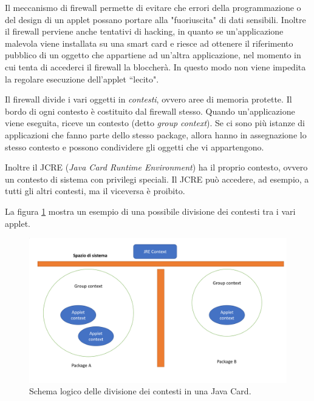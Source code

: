 Il meccanismo di firewall permette di evitare che errori della programmazione o del design di un applet possano portare alla "fuoriuscita" di dati sensibili. Inoltre il firewall perviene anche tentativi di hacking, in quanto se un'applicazione malevola viene installata su una smart card e riesce ad ottenere il riferimento pubblico di un oggetto che appartiene ad un'altra applicazione, nel momento in cui tenta di accederci il firewall la bloccherà. In questo modo non viene impedita la regolare esecuzione dell'applet ``lecito".

Il firewall divide i vari oggetti in \textit{contesti}, ovvero aree di memoria protette. Il bordo di ogni contesto è costituito dal firewall stesso. Quando un'applicazione viene eseguita, riceve un contesto (detto \textit{group context}). Se ci sono più istanze di applicazioni che fanno parte dello stesso package, allora hanno in assegnazione lo stesso contesto e possono condividere gli oggetti che vi appartengono.

Inoltre il JCRE (\textit{Java Card Runtime Environment}) ha il proprio contesto, ovvero un contesto di sistema con privilegi speciali. Il JCRE può accedere, ad esempio, a tutti gli altri contesti, ma il viceversa è proibito.

La figura \ref{fig:context} mostra un esempio di una possibile divisione dei contesti tra i vari applet.
\cite{applet_firewall}

\begin{figure}[h!]
  \centering
  \includegraphics[width=400pt]{pictures/context.png}
  \caption{Schema logico delle divisione dei contesti in una Java Card.}
  \label{fig:context}
\end{figure}
